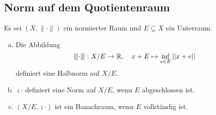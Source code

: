 \documentclass[FunkAnaSkriptSS2017.tex]{subfiles} %
\begin{document}
\subsection{Norm auf dem Quotientenraum}
Es sei $(X, \|\cdot \|)$ ein normierter Raum und $E\subseteq X$ ein Unterraum.
\begin{beh}
	\begin{enumerate}[(a)]
	\item 	Die Abbildung
	$$ \interleave{\cdot}\interleave : X/E \to \mathbb{R},\quad x+E \mapsto \inf_{e\in E} \left\lvert \left\lvert x+e \right\rvert \right\rvert$$
	definiert eine Halbnorm auf $X/E$.
	
	\item 	$\semi{\cdot}$ definiert eine Norm auf $X/E$, wenn $E$ abgeschlossen ist. 	
	
	\item $(X/E, \semi{\cdot})$ ist ein Banachraum, wenn $E$ vollständig ist.
	
	\end{enumerate}
\end{beh}
\end{document}
